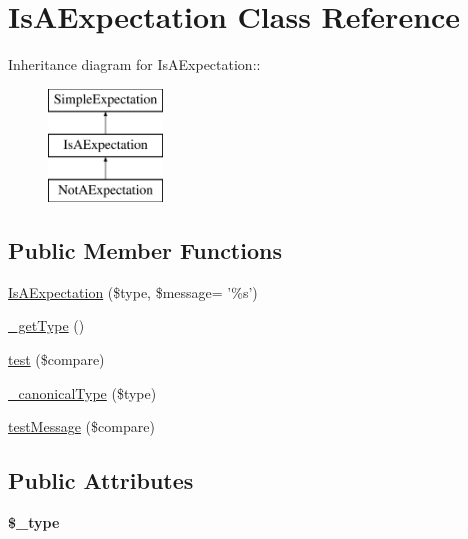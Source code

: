 \hypertarget{class_is_a_expectation}{
\section{IsAExpectation Class Reference}
\label{class_is_a_expectation}
}
Inheritance diagram for IsAExpectation::\begin{figure}[H]
\begin{center}
\leavevmode
\includegraphics[height=3cm]{class_is_a_expectation}
\end{center}
\end{figure}
\subsection*{Public Member Functions}
\begin{DoxyCompactItemize}
\item 
\hyperlink{class_is_a_expectation_a7b8cdc05b6aff778baadf80c6835fba9}{IsAExpectation} (\$type, \$message= '\%s')
\item 
\hyperlink{class_is_a_expectation_adac32cda7734913a99895e0c39461822}{\_\-getType} ()
\item 
\hyperlink{class_is_a_expectation_a759f6a0c54751334dbb7a8aed01a3858}{test} (\$compare)
\item 
\hyperlink{class_is_a_expectation_a3026f90a740bb4ab282b98e22a96d01e}{\_\-canonicalType} (\$type)
\item 
\hyperlink{class_is_a_expectation_af5e73859e22cd3ed97e13edda31de53e}{testMessage} (\$compare)
\end{DoxyCompactItemize}
\subsection*{Public Attributes}
\begin{DoxyCompactItemize}
\item 
\hypertarget{class_is_a_expectation_a2aec053584ae08728c26fcd6678e5654}{
{\bfseries \$\_\-type}}
\label{class_is_a_expectation_a2aec053584ae08728c26fcd6678e5654}

\end{DoxyCompactItemize}


